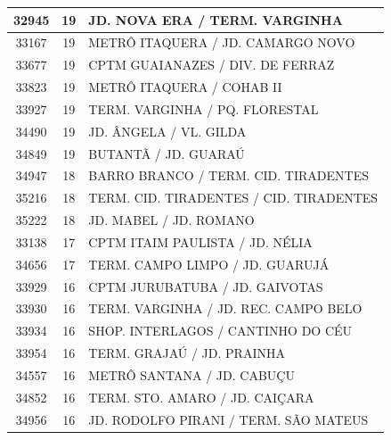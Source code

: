 \documentclass[
	12pt,				%
	oneside,			%
	a4paper,			%
	english,			%
	brazil				%
	]{abntex2ppgsi}
\begin{document}
{{\begin{apendicesenv}
\begin{longtable}{c|c|p{7cm}}
    32945 & 19    & JD. NOVA ERA / TERM. VARGINHA \\
\hline

    33167 & 19    & METRÔ ITAQUERA / JD. CAMARGO NOVO \\
\hline

    33677 & 19    & CPTM GUAIANAZES / DIV. DE FERRAZ \\
\hline

    33823 & 19    & METRÔ ITAQUERA / COHAB II \\
\hline

    33927 & 19    & TERM. VARGINHA / PQ. FLORESTAL \\
\hline

    34490 & 19    & JD. ÂNGELA / VL. GILDA \\
\hline

    34849 & 19    & BUTANTÃ / JD. GUARAÚ \\
\hline

    34947 & 18    & BARRO BRANCO / TERM. CID. TIRADENTES \\
\hline

    35216 & 18    & TERM. CID. TIRADENTES / CID. TIRADENTES \\
\hline

    35222 & 18    & JD. MABEL / JD. ROMANO \\
\hline

    33138 & 17    & CPTM ITAIM PAULISTA / JD. NÉLIA \\
\hline

    34656 & 17    & TERM. CAMPO LIMPO / JD. GUARUJÁ \\
\hline

    33929 & 16    & CPTM JURUBATUBA / JD. GAIVOTAS \\
\hline

    33930 & 16    & TERM. VARGINHA / JD. REC. CAMPO BELO \\
\hline

    33934 & 16    & SHOP. INTERLAGOS / CANTINHO DO CÉU \\
\hline

    33954 & 16    & TERM. GRAJAÚ / JD. PRAINHA \\
\hline

    34557 & 16    & METRÔ SANTANA / JD. CABUÇU \\
\hline

    34852 & 16    & TERM. STO. AMARO / JD. CAIÇARA \\
\hline

    34956 & 16    & JD. RODOLFO PIRANI / TERM. SÃO MATEUS \\
\hline


\end{longtable}
\end{apendicesenv}}}
\end{document}

